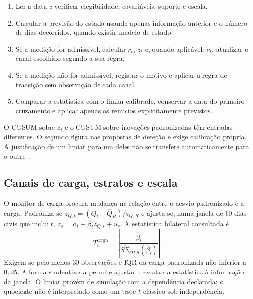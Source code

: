 \begin{tcolorbox}[colback=black!2,colframe=black!45,fontupper=\small,title={Algoritmo G.2 --- Atualização de um monitor}]
\begin{enumerate}[leftmargin=*,nosep]
\item Ler a data e verificar elegibilidade, covariáveis, suporte e escala.
\item Calcular a previsão do estado usando apenas informação anterior e o número de dias decorridos, quando existir modelo de estado.
\item Se a medição for admissível, calcular $r_t$, $z_t$ e, quando aplicável, $\nu_t$; atualizar o canal escolhido segundo a sua regra.
\item Se a medição não for admissível, registar o motivo e aplicar a regra de transição sem observação de cada canal.
\item Comparar a estatística com o limiar calibrado, conservar a data do primeiro cruzamento e aplicar apenas os reinícios explicitamente previstos.
\end{enumerate}
\end{tcolorbox}

O CUSUM sobre $z_t$ e o CUSUM sobre inovações padronizadas têm entradas diferentes. O segundo figura nas propostas de deteção e exige calibração própria. A justificação de um limiar para um deles não se transfere automaticamente para o outro~\parencite{AlwanRoberts1988,Lai1995}.

\subsection{Canais de carga, estratos e escala}
\label{sec:mat-monitores-carga-escala}
O monitor de carga procura mudança na relação entre o desvio padronizado e a carga. Padroniza-se $z_{Q,t}=(Q_t-\bar Q_R)/s_{Q,R}$ e ajusta-se, numa janela de 60 dias civis que inclui $t$, $z_s=\alpha_t+\beta_tz_{Q,s}+u_s$. A estatística bilateral consultada é
\begin{equation}
T_t^{\mathrm{carga}}=\left|\frac{\widehat\beta_t}{\widehat{SE}_{OLS}(\widehat\beta_t)}\right|.
\label{eq:mat-monitor-carga}
\end{equation}
Exigem-se pelo menos 30 observações e IQR da carga padronizada não inferior a $0{,}25$. A forma studentizada permite ajustar a escala da estatística à informação da janela. O limiar provém de simulação com a dependência declarada; o quociente não é interpretado como um teste $t$ clássico sob independência.

